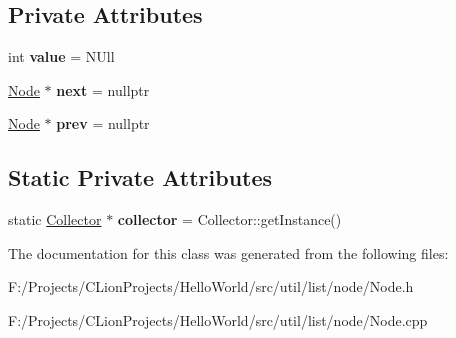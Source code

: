 \subsection*{Private Attributes}
\begin{DoxyCompactItemize}
\item 
\mbox{\label{class_node_aaa0cd30d78a90c5a6ab64eb3d58b8f87}} 
int {\bfseries value} = N\+Ull
\item 
\mbox{\label{class_node_a2559a716f69ccaa76d648d9f1b83065e}} 
\mbox{\hyperlink{class_node}{Node}} $\ast$ {\bfseries next} = nullptr
\item 
\mbox{\label{class_node_a632ea91c6a13082308f7692649a68880}} 
\mbox{\hyperlink{class_node}{Node}} $\ast$ {\bfseries prev} = nullptr
\end{DoxyCompactItemize}
\subsection*{Static Private Attributes}
\begin{DoxyCompactItemize}
\item 
\mbox{\label{class_node_a273321b333017a8aea8b8cf6b397fd6d}} 
static \mbox{\hyperlink{class_collector}{Collector}} $\ast$ {\bfseries collector} = Collector\+::get\+Instance()
\end{DoxyCompactItemize}


The documentation for this class was generated from the following files\+:\begin{DoxyCompactItemize}
\item 
F\+:/\+Projects/\+C\+Lion\+Projects/\+Hello\+World/src/util/list/node/Node.\+h\item 
F\+:/\+Projects/\+C\+Lion\+Projects/\+Hello\+World/src/util/list/node/Node.\+cpp\end{DoxyCompactItemize}
